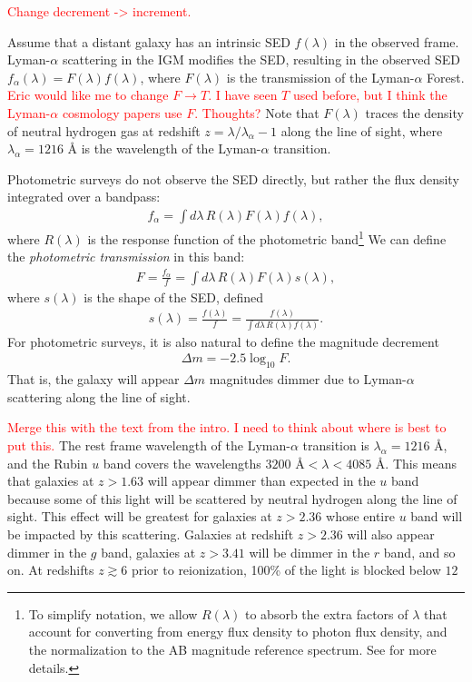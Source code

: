 \documentclass[twocolumn]{aastex631}
\newcommand{\note}[1]{\textsf{\textcolor{red}{#1}}\xspace}
\newcommand{\lya}{Lyman-$\alpha$\xspace}
\newcommand{\Ang}{\!\AA\xspace}
\begin{document}
\note{Change decrement -> increment.}

Assume that a distant galaxy has an intrinsic SED $f(\lambda)$ in the observed frame.
\lya scattering in the IGM modifies the SED, resulting in the observed SED $f_\alpha(\lambda) = F(\lambda) f(\lambda)$, where $F(\lambda)$ is the transmission of the \lya Forest.
\note{Eric would like me to change $F \to T$. I have seen $T$ used before, but I think the \lya cosmology papers use $F$. Thoughts?}
Note that $F(\lambda)$ traces the density of neutral hydrogen gas at redshift $z = \lambda / \lambda_\alpha - 1$ along the line of sight, where $\lambda_\alpha = 1216$ \Ang is the wavelength of the \lya transition.

Photometric surveys do not observe the SED directly, but rather the flux density integrated over a bandpass:
\begin{align}
    f_\alpha = \int d\lambda \, R(\lambda) F(\lambda) f(\lambda),
\end{align}
where $R(\lambda)$ is the response function of the photometric band\footnote{
    To simplify notation, we allow $R(\lambda)$ to absorb the extra factors of $\lambda$ that account for converting from energy flux density to photon flux density, and the normalization to the AB magnitude reference spectrum. 
    See \citep{hogg2022} for more details.
}
We can define the \emph{photometric transmission} in this band:
\begin{align}
    F = \frac{f_\alpha}{f} = \int d\lambda \, R(\lambda) F(\lambda) s(\lambda),
    \label{eq:F}
\end{align}
where $s(\lambda)$ is the shape of the SED, defined
\begin{align}
    s(\lambda) = \frac{f(\lambda)}{f} = \frac{f(\lambda)}{\int d\lambda \, R(\lambda) f(\lambda)}.
\end{align}
For photometric surveys, it is also natural to define the magnitude decrement
\begin{align}
    \Delta m = -2.5 \log_{10} F.
\end{align}
That is, the galaxy will appear $\Delta m$ magnitudes dimmer due to \lya scattering along the line of sight.

\note{Merge this with the text from the intro. I need to think about where is best to put this.}
The rest frame wavelength of the \lya transition is $\lambda_\alpha = 1216$ \Ang, and the Rubin $u$ band covers the wavelengths $3200$ \Ang $< \lambda < 4085$ \Ang.
This means that galaxies at $z > 1.63$ will appear dimmer than expected in the $u$ band because some of this light will be scattered by neutral hydrogen along the line of sight. 
This effect will be greatest for galaxies at $z > 2.36$ whose entire $u$ band will be impacted by this scattering.
Galaxies at redshift $z > 2.36$ will also appear dimmer in the $g$ band,
galaxies at $z > 3.41$ will be dimmer in the $r$ band, and so on.
At redshifts $z \gtrsim 6$ prior to reionization, 100\% of the light is blocked below $12$
\end{document}
